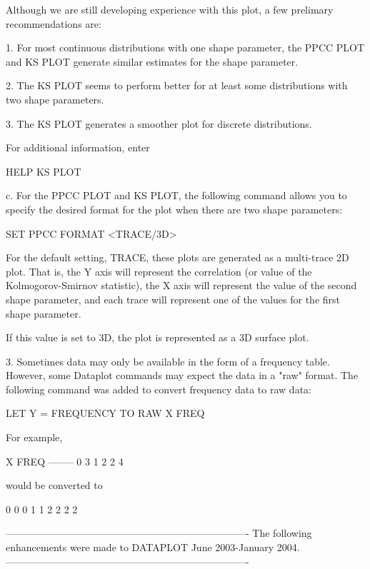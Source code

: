 {       Although we are still developing experience with this
       plot, a few prelimary recommendations are:

       1. For most continuous distributions with one shape
          parameter, the PPCC PLOT and KS PLOT generate similar
          estimates for the shape parameter.

       2. The KS PLOT seems to perform better for at least some
          distributions with two shape parameters.

       3. The KS PLOT generates a smoother plot for discrete
          distributions.

       For additional information, enter

          HELP KS PLOT

    c. For the PPCC PLOT and KS PLOT, the following command
       allows you to specify the desired format for the
       plot when there are two shape parameters:

          SET PPCC FORMAT  <TRACE/3D>

       For the default setting, TRACE, these plots are generated
       as a multi-trace 2D plot.  That is, the Y axis will
       represent the correlation (or value of the
       Kolmogorov-Smirnov statistic), the X axis will represent
       the value of the second shape parameter, and each trace
       will represent one of the values for the first shape
       parameter.

       If this value is set to 3D, the plot is represented as
       a 3D surface plot.

 3. Sometimes data may only be available in the form of a frequency
    table.  However, some Dataplot commands may expect the data
    in a "raw" format.  The following command was added to convert
    frequency data to raw data:

       LET Y = FREQUENCY TO RAW X FREQ

    For example,

        X   FREQ
        --------
        0   3
        1   2
        2   4

    would be converted to

        0
        0
        0
        1
        1
        2
        2
        2
        2

-------------------------------------------------------------------------
The following enhancements were made to DATAPLOT June 2003-January  2004.
-------------------------------------------------------------------------

}
